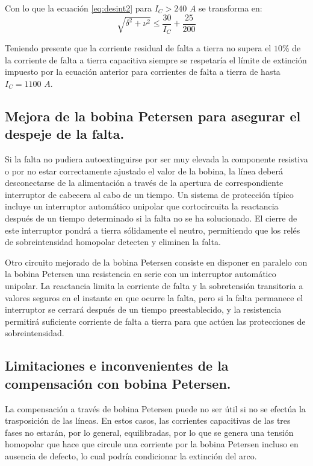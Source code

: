             Con lo que la ecuación \eqref{eq:desint2} para $I_\textit{C} > 240\textit{ A}$ se transforma en:
            \begin{equation}
                \sqrt{\delta^2+\nu^2} \leq \dfrac{30}{I_\textit{C}}+\dfrac{25}{200}
            \end{equation}

            Teniendo presente que la corriente residual de falta a tierra no supera el $10$\!\% de la corriente de falta a tierra capacitiva siempre se respetaría el límite de extinción impuesto por la ecuación anterior para corrientes de falta a tierra de hasta $I_\textit{C}= 1100\textit{ A}$.

        \subsection{Mejora de la bobina Petersen para asegurar el despeje de la falta.}
            Si la falta no pudiera autoextinguirse por ser muy elevada la componente resistiva o por no estar correctamente ajustado el valor de la bobina, la línea deberá desconectarse de la alimentación a través de la apertura de correspondiente interruptor de cabecera al cabo de un tiempo. Un sistema de protección típico incluye un interruptor automático unipolar que cortocircuita la reactancia después de un tiempo determinado si la falta no se ha solucionado. El cierre de este interruptor pondrá a tierra sólidamente el neutro, permitiendo que los relés de sobreintensidad homopolar detecten y eliminen la falta.\newline
            
            Otro circuito mejorado de la bobina Petersen consiste en disponer en paralelo con la bobina Petersen una resistencia en serie con un interruptor automático unipolar. La reactancia limita la corriente de falta y la sobretensión transitoria a valores seguros en el instante en que ocurre la falta, pero si la falta permanece el interruptor se cerrará después de un tiempo preestablecido, y la resistencia permitirá suficiente corriente de falta a tierra para que actúen las protecciones de sobreintensidad.

        \subsection{Limitaciones e inconvenientes de la compensación con bobina Petersen.}
            La compensación a través de bobina Petersen puede no ser útil si no se efectúa la trasposición de las líneas. En estos casos, las corrientes capacitivas de las tres fases no estarán, por lo general, equilibradas, por lo que se genera una tensión homopolar que hace que circule una corriente por la bobina Petersen incluso en ausencia de defecto, lo cual podría condicionar la extinción del arco.\newline
            
